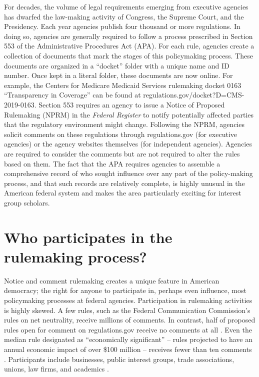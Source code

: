 \documentclass[
      12pt,
        ]{article}
\begin{document}
For decades, the volume of legal requirements emerging from executive
agencies has dwarfed the law-making activity of Congress, the Supreme
Court, and the Presidency. Each year agencies publish four thousand or
more regulations. In doing so, agencies are generally required to follow
a process prescribed in Section 553 of the Administrative Procedures Act
(APA). For each rule, agencies create a collection of documents that
mark the stages of this policymaking process. These documents are
organized in a ``docket'' folder with a unique name and ID number. Once
kept in a literal folder, these documents are now online. For example,
the Centers for Medicare Medicaid Services rulemaking docket 0163
``Transparency in Coverage'' can be found at
regulations.gov/docket?D=CMS-2019-0163. Section 553 requires an agency
to issue a Notice of Proposed Rulemaking (NPRM) in the \emph{Federal
Register} to notify potentially affected parties that the regulatory
environment might change. Following the NPRM, agencies solicit comments
on these regulations through regulations.gov (for executive agencies) or
the agency websites themselves (for independent agencies). Agencies are
required to consider the comments but are not required to alter the
rules based on them. The fact that the APA requires agencies to assemble
a comprehensive record of who sought influence over any part of the
policy-making process, and that such records are relatively complete, is
highly unusual in the American federal system and makes the area
particularly exciting for interest group scholars.

\hypertarget{who-participates-in-the-rulemaking-process}{%
\section{Who participates in the rulemaking
process?}\label{who-participates-in-the-rulemaking-process}}

Notice and comment rulemaking creates a unique feature in American
democracy; the right for anyone to participate in, perhaps even
influence, most policymaking processes at federal agencies.
Participation in rulemaking activities is highly skewed. A few rules,
such as the Federal Communication Commission's rules on net neutrality,
receive millions of comments. In contrast, half of proposed rules open
for comment on regulations.gov receive no comments at all
\citep{LibgoberJOP}. Even the median rule designated as ``economically
significant'' -- rules projected to have an annual economic impact of
over \$100 million -- receives fewer than ten comments
\citep{judgelord2019SPSA}. Participants include businesses, public
interest groups, trade associations, unions, law firms, and academics
\citep[\citet{YackeeJOP2006}]{CuellarALR2005}.
\end{document}

